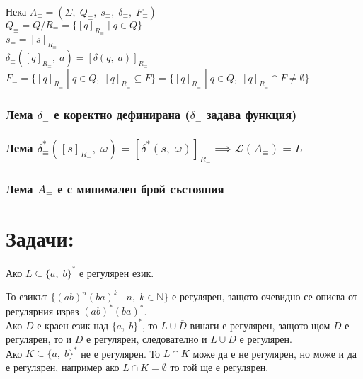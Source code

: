 \documentclass[12pt]{article}
\newcommand{\Lang}{\mathcal{L}}
\newcommand{\N}{\mathbb{N}}
\begin{document}
Нека $A_\equiv = (\Sigma, \; Q_\equiv, \; s_\equiv, \; \delta_\equiv, \; F_\equiv)$ \\

$Q_\equiv = Q/R_\equiv = \{[q]_{R_\equiv} \; | \; q \in Q\}$ \\

$s_\equiv = [s]_{R_\equiv}$ \\

$\delta_\equiv([q]_{R_\equiv}, \; a) = [\delta(q, \; a)]_{R_\equiv}$ \\

$F_\equiv = \{[q]_{R_\equiv} \; | \; q \in Q, \; [q]_{R_\equiv} \subseteq F\} = \{[q]_{R_\equiv} \; | \; q \in Q, \; [q]_{R_\equiv} \cap F \neq \emptyset\}$

\subsubsection*{Лема $\delta_\equiv$ е коректно дефинирана ($\delta_\equiv$ задава функция)}
\subsubsection*{Лема $\delta_\equiv^*([s]_{R_\equiv}, \; \omega) = [\delta^*(s, \; \omega)]_{R_\equiv} \implies \Lang(A_\equiv) = L$}
\subsubsection*{Лема $A_\equiv$ е с минимален брой състояния}

\section*{Задачи:}

Ако $L \subseteq \{a, \; b\}^*$ е регулярен език.

То езикът $\{(ab)^n(ba)^k \; | \; n, \; k \in \N\}$ е регулярен, защото очевидно се описва от регулярния израз $(ab)^*(ba)^*$. \\

Ако $D$ е краен език над $\{a, \; b\}^*$, то $L \cup \overline{D}$ винаги е регулярен, защото щом $D$ е регулярен, то и $\overline{D}$ е регулярен, следователно и $L \cup \overline{D}$ е регулярен. \\

Ако $K \subseteq \{a, \; b\}^*$ не е регулярен. То $L \cap K$ може да е не регулярен, но може и да е регулярен, например ако $L \cap K = \emptyset$ то той ще е регулярен. \\
\end{document}
